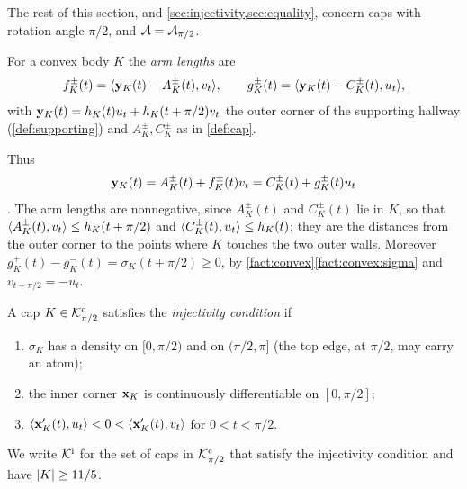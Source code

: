 The rest of this section, and \cref{sec:injectivity,sec:equality}, concern caps
with rotation angle $\pi/2$, and $\mathcal{A}=\mathcal{A}_{\pi/2}$.

\begin{definition}\label{def:arms}
For a convex body $K$ the \emph{arm lengths} are
\[
  f_K^\pm(t)=\langle \mathbf{y}_K(t)-A_K^\pm(t),v_t\rangle,\qquad g_K^\pm(t)
    =\langle \mathbf{y}_K(t)-C_K^\pm(t),u_t\rangle,
\]
with $\mathbf{y}_K(t)=h_K(t)u_t+h_K(t+\pi/2)v_t$ the outer corner of the supporting
hallway (\cref{def:supporting}) and $A_K^\pm,C_K^\pm$ as in \cref{def:cap}.
\end{definition}

Thus
\[
  \mathbf{y}_K(t)=A_K^\pm(t)+f_K^\pm(t)v_t=C_K^\pm(t)+g_K^\pm(t)u_t
\]
. The arm lengths are nonnegative, since $A_K^\pm(t)$ and
$C_K^\pm(t)$ lie in $K$, so that $\langle A_K^\pm(t),v_t\rangle\le h_K(t+\pi/2)$ and
$\langle C_K^\pm(t),u_t\rangle\le h_K(t)$; they are the distances from the outer corner
to the points where $K$ touches the two outer walls. Moreover
$g_K^+(t)-g_K^-(t)=\sigma_K(t+\pi/2)\ge0$, by
\cref{fact:convex}\ref{fact:convex:sigma} and $v_{t+\pi/2}=-u_t$.

\begin{definition}\label{def:inj}
A cap $K\in\mathcal{K}^{\mathrm{c}}_{\pi/2}$ satisfies the \emph{injectivity condition} if
\begin{enumerate}[label=(\arabic*),leftmargin=2.2em]
\item $\sigma_K$ has a density on $[0,\pi/2)$ and on $(\pi/2,\pi]$ (the top
edge, at $\pi/2$, may carry an atom);
\item the inner corner $\mathbf{x}_K$ is continuously differentiable on $[0,\pi/2]$;
\item $\langle \mathbf{x}_K'(t),u_t\rangle<0<\langle \mathbf{x}_K'(t),v_t\rangle$ for $0<t<\pi/2$.
\end{enumerate}
We write $\mathcal{K}^{\mathrm{i}}$ for the set of caps in $\mathcal{K}^{\mathrm{c}}_{\pi/2}$ that satisfy the injectivity
condition and have $\lvert K\rvert\ge11/5$.
\end{definition}

